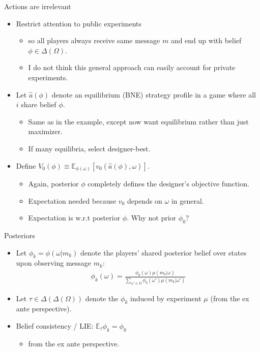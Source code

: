 \documentclass[english,10pt
,aspectratio=169
]{beamer}
\begin{document}
\begin{frame}{Actions are irrelevant}
\begin{itemize}
	\item Restrict attention to \alert{public experiments}
	\begin{itemize}
		\item so all players always receive same message $m$ and end up with  belief $\phi \in \varDelta (\Omega)$.
		\item I do not think this general approach can easily account for private experiments.
	\end{itemize}
	\item Let $\hat{a}(\phi)$ denote an equilibrium (BNE) strategy profile in a game where all $i$ share belief $\phi$.
	\begin{itemize}
		\item Same as in the example, except now want equilibrium rather than just maximizer.
		\item If many equilibria, select designer-best.
	\end{itemize}
	\item Define $V_0 (\phi) \equiv \mathbb{E}_{\phi(\omega)} \left[v_0 (\hat{a}(\phi), \omega)\right]$.
	\begin{itemize}
		\item Again, posterior $\phi$ completely defines the designer's objective function.
		\item Expectation needed because $v_0$ depends on $\omega$ in general.
		\item Expectation is w.r.t posterior $\phi$. Why not prior $\phi_0$?
	\end{itemize}
\end{itemize}
\end{frame}


\begin{frame}{Posteriors}
\begin{itemize}
	\item Let $\phi_k = \phi (\omega | m_k)$ denote the players' shared posterior belief over states upon observing message $m_k$:
	\begin{align*}
		\phi_k (\omega) = \frac{\phi_0(\omega) \mu(m_k|\omega)}{\sum_{\omega' \in \Omega} \phi_0 (\omega') \mu(m_k | \omega')}
	\end{align*}
	\item Let $\tau \in \varDelta(\varDelta(\Omega))$ denote the  $\phi_k$ induced by experiment $\mu$ (from the ex ante perspective).
	\item Belief consistency / LIE: $\mathbb{E}_\tau \phi_k = \phi_0$
	\begin{itemize}
		\item from the ex ante perspective.
	\end{itemize}
\end{itemize}
\end{frame}
\end{document}
